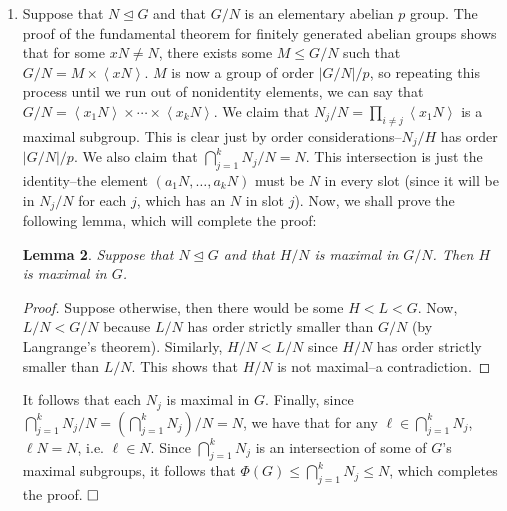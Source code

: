 \documentclass[12pt]{article}
\newtheorem{lemma}{Lemma}
\theoremstyle{definitionstyle}
\def\mbb#1{\mathbb{#1}}
\newcommand{\Z}{\mbb Z}
\newcommand{\gen}[1]{\left\langle #1 \right\rangle}
\newcommand{\nsg}{\trianglelefteq}
\begin{document}
\begin{enumerate}[leftmargin=\labelsep]
\begin{enumerate}
\begin{lemma}
\begin{proof}
\begin{enumerate}[label=(\arabic*)]
						Next suppose that $G' \nsg H$. By the third isomorphism theorem, we have that,
						\begin{align*}
							\frac{G/[G,G]}{H/[G,G]} \cong G/H
						\end{align*}
						And since $G/[G,G]$ is abelian, any quotient of it is abelian, which completes the proof.
					\end{enumerate}
				\end{proof}
			\end{lemma}
			The above lemma shows that $G / \Phi(G)$ is abelian. By the fundemental theorem of finitely generated abelian groups, $G/\Phi(G)$ is a direct product of cyclic groups, say $\Z/n_1 \times \cdots \times \Z/n_k$. Notice next that since $x^p \in \Phi(G)$ for every $x \in G$, $x\Phi(G)$ has order either 1 or $p$. If any of the $n_i$ were neither 1 or $p$, then $G$ would have an element of order $n_i \neq 1$ and $n_i \neq p$ a contradiction. So $G/\Phi(G)$ is an elementary abelian $p$ group.
			
			\item Suppose that $N \nsg G$ and that $G/N$ is an elementary abelian $p$ group. The proof of the fundamental theorem for finitely generated abelian groups shows that for some $xN \neq N$, there exists some $M \leq G/N$ such that $G/N = M \times \gen{xN}$. $M$ is now a group of order $|G/N|/p$, so repeating this process until we run out of nonidentity elements, we can say that $G/N = \gen{x_1N} \times \cdots \times \gen{x_kN}$. We claim that $N_j / N = \prod_{i \neq j} \gen{x_1N}$ is a maximal subgroup. This is clear just by order considerations--$N_j/H$ has order $|G/N|/p$. We also claim that $\bigcap_{j=1}^k N_j/N =N$. This intersection is just the identity--the element $(a_1N, \ldots, a_kN)$ must be $N$ in every slot (since it will be in $N_j/N$ for each $j$, which has an $N$ in slot $j$). Now, we shall prove the following lemma, which will complete the proof:
			\begin{lemma}
				Suppose that $N \nsg G$ and that $H/N$ is maximal in $G/N$. Then $H$ is maximal in $G$.
			\end{lemma}
			\begin{proof}
				Suppose otherwise, then there would be some $H < L < G$. Now, $L/N < G/N$ because $L/N$ has order strictly smaller than $G/N$ (by Langrange's theorem). Similarly, $H/N < L/N$ since $H/N$ has order strictly smaller than $L/N$. This shows that $H/N$ is not maximal--a contradiction.
			\end{proof}
			It follows that each $N_j$ is maximal in $G$. Finally, since $\bigcap_{j=1}^k N_j/N = (\bigcap_{j=1}^k N_j)/N = N$, we have that for any $\ell \in \bigcap_{j=1}^k N_j$, $\ell N = N$, i.e. $\ell \in N$. Since $\bigcap_{j=1}^k N_j$ is an intersection of some of $G$'s maximal subgroups, it follows that $\Phi(G) \leq \bigcap_{j=1}^k N_j \leq N$, which completes the proof. $\hfill \square$
		\end{enumerate}
	

\end{enumerate}
\end{document}
